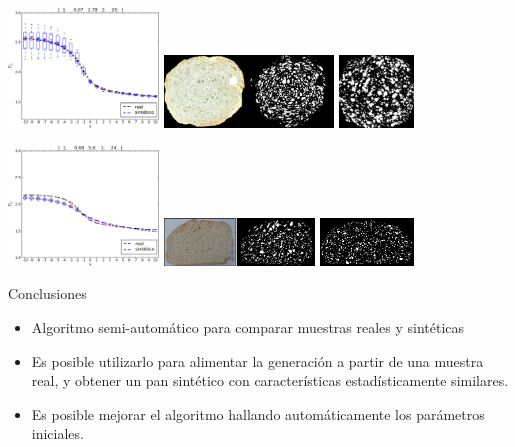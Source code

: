 \documentclass[spanish,unknownkeysallowed,10pt]{beamer}
\begin{document}
\begin{frame}
\includegraphics[width=4cm]{../figures/bestboxplot}
\includegraphics[width=4.5cm]{../figures/realbin}
\includegraphics[width=2cm]{../figures/best}

\includegraphics[width=4cm]{../figures/bestboxplot2}
\includegraphics[width=4cm]{../figures/realbin2}
\includegraphics[width=2.5cm]{../figures/best2}
\end{frame}



\begin{frame}{Conclusiones}
\begin{block}{}
\begin{itemize}
\item Algoritmo semi-automático para comparar muestras reales y sintéticas
\item Es posible utilizarlo para alimentar la generación a partir de una muestra real, y obtener un pan sintético con características estadísticamente similares.
\item Es posible mejorar el algoritmo hallando automáticamente los parámetros iniciales.
\end{itemize}
\end{block}

\end{frame}
\end{document}
